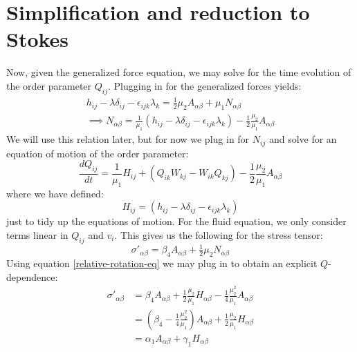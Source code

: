 \documentclass[reqno]{article}
\begin{document}
  \section{Simplification and reduction to Stokes}
  Now, given the generalized force equation, we may solve for the time
  evolution of the order parameter $Q_{ij}$.
  Plugging in for the generalized forces yields:
  \begin{equation} \label{relative-rotation-eq}
    \begin{split}
    h_{ij} - \lambda \delta_{ij} - \epsilon_{ijk} \lambda_k
    = \tfrac12 \mu_2 A_{\alpha \beta}
    + \mu_1 N_{\alpha \beta} \\
    \implies
    N_{\alpha \beta}
    =
    \frac{1}{\mu_1}
    \left(
      h_{ij} - \lambda \delta_{ij} - \epsilon_{ijk} \lambda_k
    \right)
    - \frac12 \frac{\mu_2}{\mu_1} A_{\alpha \beta}
    \end{split}
  \end{equation}
  We will use this relation later, but for now we plug in for $N_{ij}$ and solve
  for an equation of motion of the order parameter:
  \begin{equation}
    \frac{d Q_{ij}}{dt}
    =
    \frac{1}{\mu_1}
    H_{ij}
    +
    \left(
      Q_{ik} W_{kj} - W_{ik} Q_{kj}
    \right)
    - \frac12 \frac{\mu_2}{\mu_1} A_{\alpha \beta}
  \end{equation}
  where we have defined:
  \begin{equation}
    H_{ij}
    =
    \left(
      h_{ij} - \lambda \delta_{ij} - \epsilon_{ijk} \lambda_k
    \right)
  \end{equation}
  just to tidy up the equations of motion.
  For the fluid equation, we only consider terms linear in $Q_{ij}$ and $v_i$.
  This gives us the following for the stress tensor:
  \begin{equation}
    \sigma'_{\alpha \beta}
    =
    \beta_4 A_{\alpha \beta}
    + \tfrac12 \mu_2 N_{\alpha \beta}
  \end{equation}
  Using equation \eqref{relative-rotation-eq} we may plug in to obtain an
  explicit $Q$-dependence:
  \begin{equation}
    \begin{split}
    \sigma'_{\alpha \beta}
    &=
    \beta_4 A_{\alpha \beta}
    + \frac12 \frac{\mu_2}{\mu_1} H_{\alpha \beta}
    - \frac14 \frac{\mu_2^2}{\mu_1} A_{\alpha \beta} \\
    &= \left( \beta_4 - \frac14 \frac{\mu_2^2}{\mu_1} \right) A_{\alpha \beta}
    + \frac12 \frac{\mu_2}{\mu_1} H_{\alpha \beta} \\
    &= \alpha_1 A_{\alpha \beta} + \gamma_1 H_{\alpha \beta}
    \end{split}
  \end{equation}
\end{document}
